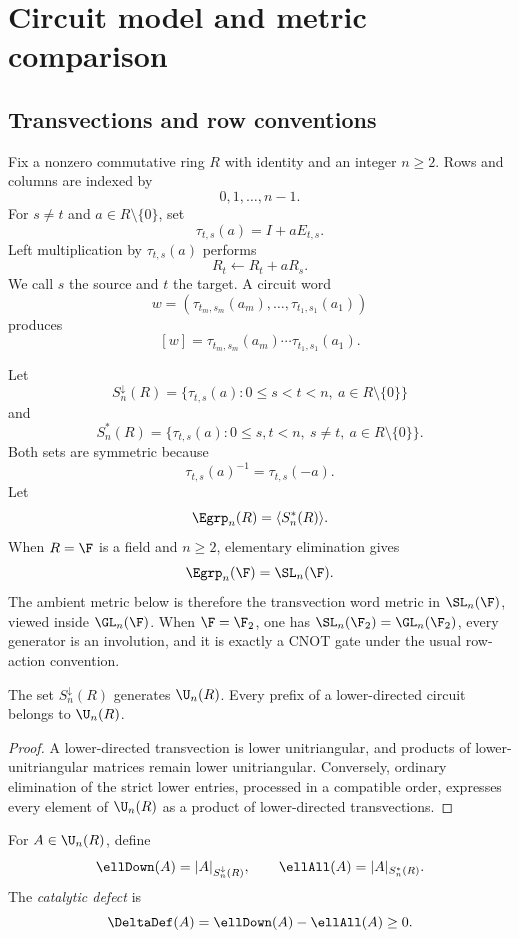 \section{Circuit model and metric comparison}\label{sec:model}

\subsection{Transvections and row conventions}

Fix a nonzero commutative ring $R$ with identity and an integer $n\ge2$.  Rows and columns are indexed by
\[
0,1,\ldots,n-1.
\]
For $s\ne t$ and $a\in R\setminus\{0\}$, set
\[
\tau_{t,s}(a)=I+aE_{t,s}.
\]
Left multiplication by $\tau_{t,s}(a)$ performs
\[
R_t\longleftarrow R_t+aR_s.
\]
We call $s$ the source and $t$ the target.  A circuit word
\[
w=(\tau_{t_m,s_m}(a_m),\ldots,\tau_{t_1,s_1}(a_1))
\]
produces
\[
[w]=\tau_{t_m,s_m}(a_m)\cdots\tau_{t_1,s_1}(a_1).
\]

Let
\[
S_n^\downarrow(R)
=\{\tau_{t,s}(a):0\le s<t<n,\ a\in R\setminus\{0\}\}
\]
and
\[
S_n^*(R)
=\{\tau_{t,s}(a):0\le s,t<n,\ s\ne t,\ a\in R\setminus\{0\}\}.
\]
Both sets are symmetric because
\[
\tau_{t,s}(a)^{-1}=\tau_{t,s}(-a).
\]
Let
\[
\Egrp_n(R)=\langle S_n^*(R)\rangle.
\]
When $R=\F$ is a field and $n\ge2$, elementary elimination gives
\[
\Egrp_n(\F)=\SL_n(\F).
\]
The ambient metric below is therefore the transvection word metric in $\SL_n(\F)$, viewed inside $\GL_n(\F)$.  When $\F=\F_2$, one has $\SL_n(\F_2)=\GL_n(\F_2)$, every generator is an involution, and it is exactly a CNOT gate under the usual row-action convention.

\begin{lemma}\label{lem:lower-generates}
The set $S_n^\downarrow(R)$ generates $\U_n(R)$.  Every prefix of a lower-directed circuit belongs to $\U_n(R)$.
\end{lemma}

\begin{proof}
A lower-directed transvection is lower unitriangular, and products of lower-unitriangular matrices remain lower unitriangular.  Conversely, ordinary elimination of the strict lower entries, processed in a compatible order, expresses every element of $\U_n(R)$ as a product of lower-directed transvections.
\end{proof}

\begin{definition}\label{def:lengths}
For $A\in\U_n(R)$, define
\[
\ellDown(A)=|A|_{S_n^\downarrow(R)},
\qquad
\ellAll(A)=|A|_{S_n^*(R)}.
\]
The \emph{catalytic defect} is
\[
\DeltaDef(A)=\ellDown(A)-\ellAll(A)\ge0.
\]
\end{definition}

